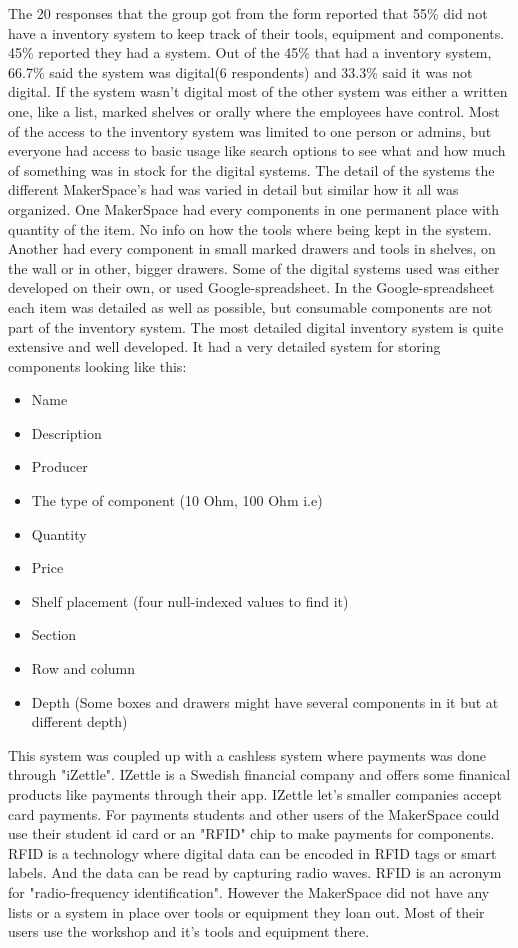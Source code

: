 The 20 responses that the group got from the form reported that 55\% did not have a inventory system to keep track of their tools, equipment and components. 45\% reported they had a system. Out of the 45\% that had a inventory system, 66.7\% said the system was digital(6 respondents) and 33.3\% said it was not digital. If the system wasn't digital most of the other system was either a written one, like a list, marked shelves or orally where the employees have control. Most of the access to the inventory system was limited to one person or admins, but everyone had access to basic usage like search options to see what and how much of something was in stock for the digital systems. 
The detail of the systems the different MakerSpace's had was varied in detail but similar how it all was organized. One MakerSpace had every components in one permanent place with quantity of the item. No info on how the tools where being kept in the system. Another had every component in small marked drawers and tools in shelves, on the wall or in other, bigger drawers. Some of the digital systems used was either developed on their own, or used Google-spreadsheet. In the Google-spreadsheet each item was detailed as well as possible, but consumable components are not part of the inventory system. The most detailed digital inventory system is quite extensive and well developed. It had a very detailed system for storing components looking like this:

\begin{itemize}
    \item Name 
    \item Description
    \item Producer
    \item The type of component (10 Ohm, 100 Ohm i.e)
    \item Quantity
    \item Price
    \item Shelf placement (four null-indexed values to find it) 
    \item Section
    \item Row and column
    \item Depth (Some boxes and drawers might have several components in it but at different depth)
\end{itemize}
This system was coupled up with a cashless system where payments was done through "iZettle"\cite{iZettle_Financial_Products}. IZettle is a Swedish financial company and offers some finanical products like payments through their app. IZettle let's smaller companies accept card payments\cite{What_is_iZettle}. For payments students and other users of the MakerSpace could use their student id card or an "RFID" chip to make payments for components. RFID is a technology where digital data can be encoded in RFID tags or smart labels. And the data can be read by capturing radio waves. RFID is an acronym for "radio-frequency identification"\cite{What_is_RFID}. However the MakerSpace did not have any lists or a system in place over tools or equipment they loan out. Most of their users use the workshop and it's tools and equipment there. 


